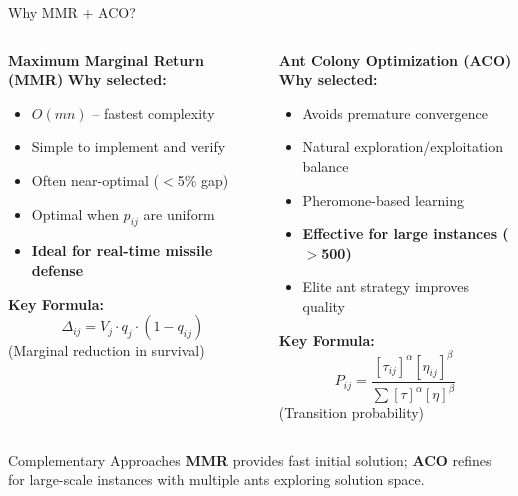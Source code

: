 \documentclass[aspectratio=43,8pt]{beamer}
\begin{document}
\begin{frame}{Why MMR + ACO?}
\begin{columns}[t]
\begin{block}{\textbf{Maximum Marginal Return (MMR)}}
\textbf{Why selected:}
\begin{itemize}
    \item \textcolor{accentgreen}{$O(mn)$} -- fastest complexity
    \item Simple to implement and verify
    \item Often near-optimal ($<$5\% gap)
    \item Optimal when $p_{ij}$ are uniform
    \item \textbf{Ideal for real-time missile defense}
\end{itemize}

\vspace{0.2cm}
\textbf{Key Formula:}
$$\Delta_{ij} = V_j \cdot q_j \cdot (1 - q_{ij})$$
{\small (Marginal reduction in survival)}
\end{block}

\begin{alertblock}{\textbf{Ant Colony Optimization (ACO)}}
\textbf{Why selected:}
\begin{itemize}
    \item Avoids premature convergence
    \item Natural exploration/exploitation balance
    \item Pheromone-based learning
    \item \textbf{Effective for large instances ($>$500)}
    \item Elite ant strategy improves quality
\end{itemize}

\vspace{0.2cm}
\textbf{Key Formula:}
$$P_{ij} = \frac{[\tau_{ij}]^\alpha [\eta_{ij}]^\beta}{\sum [\tau]^\alpha [\eta]^\beta}$$
{\small (Transition probability)}
\end{alertblock}
\end{columns}

\vspace{0.3cm}
\begin{exampleblock}{Complementary Approaches}
\textbf{MMR} provides fast initial solution; \textbf{ACO} refines for large-scale instances with multiple ants exploring solution space.
\end{exampleblock}
\end{frame}
\end{document}
